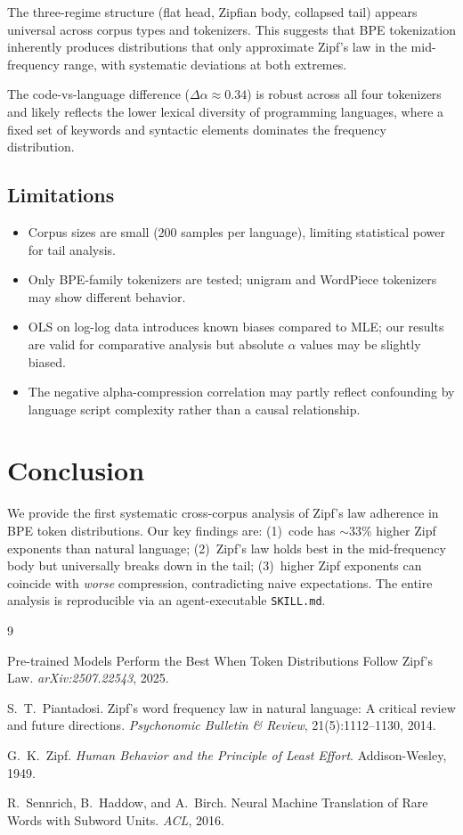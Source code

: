 \documentclass[11pt]{article}
\begin{document}
The three-regime structure (flat head, Zipfian body, collapsed tail) appears universal across corpus types and tokenizers.
This suggests that BPE tokenization inherently produces distributions that only approximate Zipf's law in the mid-frequency range, with systematic deviations at both extremes.

The code-vs-language difference ($\Delta\alpha \approx 0.34$) is robust across all four tokenizers and likely reflects the lower lexical diversity of programming languages, where a fixed set of keywords and syntactic elements dominates the frequency distribution.

\subsection{Limitations}

\begin{itemize}
  \item Corpus sizes are small (200 samples per language), limiting statistical power for tail analysis.
  \item Only BPE-family tokenizers are tested; unigram and WordPiece tokenizers may show different behavior.
  \item OLS on log-log data introduces known biases compared to MLE; our results are valid for comparative analysis but absolute $\alpha$ values may be slightly biased.
  \item The negative alpha-compression correlation may partly reflect confounding by language script complexity rather than a causal relationship.
\end{itemize}

\section{Conclusion}

We provide the first systematic cross-corpus analysis of Zipf's law adherence in BPE token distributions.
Our key findings are:
(1)~code has $\sim$33\% higher Zipf exponents than natural language;
(2)~Zipf's law holds best in the mid-frequency body but universally breaks down in the tail;
(3)~higher Zipf exponents can coincide with \emph{worse} compression, contradicting naive expectations.
The entire analysis is reproducible via an agent-executable \texttt{SKILL.md}.

\begin{thebibliography}{9}

Pre-trained Models Perform the Best When Token Distributions Follow Zipf's Law.
\emph{arXiv:2507.22543}, 2025.

S.~T.~Piantadosi.
Zipf's word frequency law in natural language: A critical review and future directions.
\emph{Psychonomic Bulletin \& Review}, 21(5):1112--1130, 2014.

G.~K.~Zipf.
\emph{Human Behavior and the Principle of Least Effort}.
Addison-Wesley, 1949.

R.~Sennrich, B.~Haddow, and A.~Birch.
Neural Machine Translation of Rare Words with Subword Units.
\emph{ACL}, 2016.

\end{thebibliography}
\end{document}
